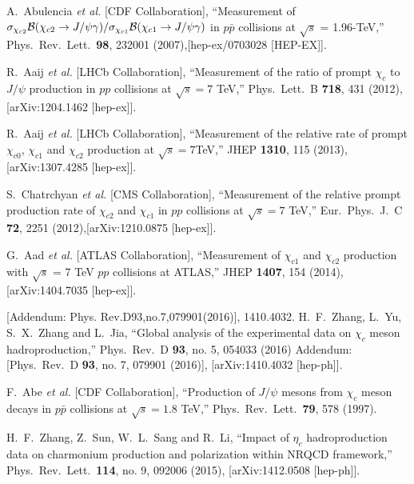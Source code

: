 \documentclass[aps,prc,preprint,superscriptaddress,showpacs,showkeys,amsmath]{revtex4-1}
\begin{document}
\begin{thebibliography}{100}
  A.~Abulencia {\it et al.} [CDF Collaboration],
  ``Measurement of $\sigma_{\chi_{c2}}{\cal B}(\chi_{c2} \to J/\psi \gamma)/\sigma_{\chi_{c1}} {\cal B}(\chi_{c1} \to J/\psi \gamma)$ 
  in $p \bar{p}$ collisions at $\sqrt{s}$ = 1.96-TeV,''
  Phys.\ Rev.\ Lett.\  {\bf 98}, 232001 (2007),[hep-ex/0703028 [HEP-EX]].


  R.~Aaij {\it et al.} [LHCb Collaboration],
  ``Measurement of the ratio of prompt $\chi_{c}$ to $J/\psi$ production in $pp$ collisions at $\sqrt{s}=7$ TeV,''
  Phys.\ Lett.\ B {\bf 718}, 431 (2012),[arXiv:1204.1462 [hep-ex]].


  R.~Aaij {\it et al.} [LHCb Collaboration],
  ``Measurement of the relative rate of prompt $\chi_{c0}$, $\chi_{c1}$ and $\chi_{c2}$ production at $\sqrt{s}=7$TeV,''
  JHEP {\bf 1310}, 115 (2013), [arXiv:1307.4285 [hep-ex]].
 
  S.~Chatrchyan {\it et al.} [CMS Collaboration],
  ``Measurement of the relative prompt production rate of $\chi_{c2}$ and $\chi_{c1}$ 
  in $pp$ collisions at $\sqrt{s}=7$ TeV,''
  Eur.\ Phys.\ J.\ C {\bf 72}, 2251 (2012),[arXiv:1210.0875 [hep-ex]].



  G.~Aad {\it et al.} [ATLAS Collaboration],
  ``Measurement of $\chi_{c1}$ and $\chi_{c2}$ production with $\sqrt{s}$ = 7 TeV $pp$ collisions at ATLAS,''
  JHEP {\bf 1407}, 154 (2014), [arXiv:1404.7035 [hep-ex]].

 [Addendum: Phys. Rev.D93,no.7,079901(2016)], 1410.4032.
  H.~F.~Zhang, L.~Yu, S.~X.~Zhang and L.~Jia,
  ``Global analysis of the experimental data on $\chi_c$ meson hadroproduction,''
  Phys.\ Rev.\ D {\bf 93}, no. 5, 054033 (2016) Addendum: [Phys.\ Rev.\ D {\bf 93}, no. 7, 079901 (2016)], 
  [arXiv:1410.4032 [hep-ph]].

  F.~Abe {\it et al.} [CDF Collaboration],
  ``Production of $J/\psi$ mesons from $\chi_c$ meson decays in $p\bar{p}$ collisions at $\sqrt{s} = 1.8$ TeV,''
  Phys.\ Rev.\ Lett.\  {\bf 79}, 578 (1997).


  H.~F.~Zhang, Z.~Sun, W.~L.~Sang and R.~Li,
  ``Impact of $\eta_c$ hadroproduction data on charmonium production and polarization within NRQCD framework,''
  Phys.\ Rev.\ Lett.\  {\bf 114}, no. 9, 092006 (2015), [arXiv:1412.0508 [hep-ph]].
  

\end{thebibliography}
\end{document}
